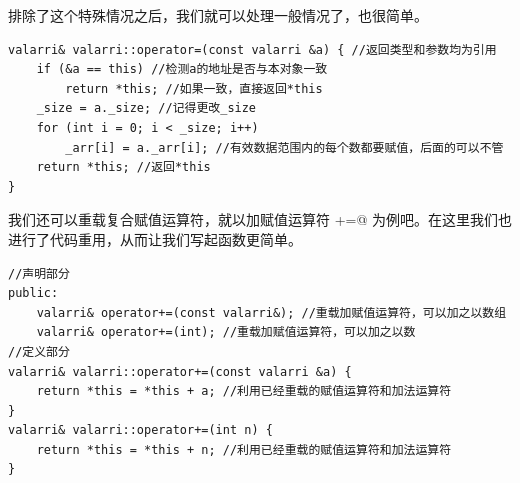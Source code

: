 排除了这个特殊情况之后，我们就可以处理一般情况了，也很简单。
\begin{lstlisting}
valarri& valarri::operator=(const valarri &a) { //返回类型和参数均为引用
    if (&a == this) //检测a的地址是否与本对象一致
        return *this; //如果一致，直接返回*this
    _size = a._size; //记得更改_size
    for (int i = 0; i < _size; i++)
        _arr[i] = a._arr[i]; //有效数据范围内的每个数都要赋值，后面的可以不管
    return *this; //返回*this
}
\end{lstlisting}\par
我们还可以重载复合赋值运算符，就以加赋值运算符 \lstinline@+=@ 为例吧。在这里我们也进行了代码重用，从而让我们写起函数更简单。
\begin{lstlisting}
//声明部分
public:
    valarri& operator+=(const valarri&); //重载加赋值运算符，可以加之以数组
    valarri& operator+=(int); //重载加赋值运算符，可以加之以数
//定义部分
valarri& valarri::operator+=(const valarri &a) {
    return *this = *this + a; //利用已经重载的赋值运算符和加法运算符
}
valarri& valarri::operator+=(int n) {
    return *this = *this + n; //利用已经重载的赋值运算符和加法运算符
}
\end{lstlisting}\par
